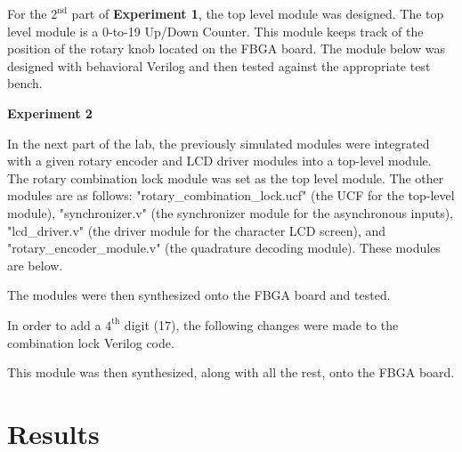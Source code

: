 \documentclass[a4paper,12pt]{article}
\begin{document}


For the $2^{\text{nd}}$ part of \textbf{Experiment 1}, the top level module was designed. The top level module is a 0-to-19 Up/Down Counter. This module keeps track of the position of the rotary knob located on the FBGA board. The module below was designed with behavioral Verilog and then tested against the appropriate test bench.



\hspace{-15pt}\textbf{Experiment 2}

In the next part of the lab, the previously simulated modules were integrated with a given rotary encoder and LCD driver modules into a top-level module. The rotary combination lock module was set as the top level module. The other modules are as follows: "rotary\_combination\_lock.ucf" (the UCF for the top-level module), "synchronizer.v" (the synchronizer module for the asynchronous inputs), "lcd\_driver.v" (the driver module for the character LCD screen), and "rotary\_encoder\_module.v" (the quadrature decoding module). These modules are below.







The modules were then synthesized onto the FBGA board and tested. 

In order to add a $4^{\text{th}}$ digit (17), the following changes were made to the combination lock Verilog code. 



This module was then synthesized, along with all the rest, onto the FBGA board.

\section*{Results}
\end{document}
